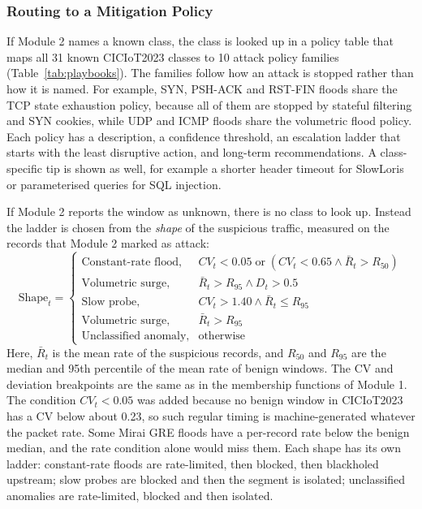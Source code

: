 \documentclass[]{interact}
\theoremstyle{plain}%
\theoremstyle{definition}
\theoremstyle{remark}
\begin{document}
\subsubsection{Routing to a Mitigation Policy}
If Module 2 names a known class, the class is looked up in a policy table that maps all 31 known CICIoT2023 classes to 10 attack policy families (Table~\ref{tab:playbooks}). The families follow how an attack is stopped rather than how it is named. For example, SYN, PSH-ACK and RST-FIN floods share the TCP state exhaustion policy, because all of them are stopped by stateful filtering and SYN cookies, while UDP and ICMP floods share the volumetric flood policy. Each policy has a description, a confidence threshold, an escalation ladder that starts with the least disruptive action, and long-term recommendations. A class-specific tip is shown as well, for example a shorter header timeout for SlowLoris or parameterised queries for SQL injection.

If Module 2 reports the window as unknown, there is no class to look up. Instead the ladder is chosen from the \emph{shape} of the suspicious traffic, measured on the records that Module 2 marked as attack:
\begin{equation}
  \text{Shape}_t =
  \begin{cases}
    \text{Constant-rate flood}, & CV_t < 0.05 \;\text{or}\; \left(CV_t < 0.65 \wedge \bar{R}_t > R_{50}\right)\\
    \text{Volumetric surge}, & \bar{R}_t > R_{95} \wedge D_t > 0.5\\
    \text{Slow probe}, & CV_t > 1.40 \wedge \bar{R}_t \le R_{95}\\
    \text{Volumetric surge}, & \bar{R}_t > R_{95}\\
    \text{Unclassified anomaly}, & \text{otherwise}
  \end{cases}
  \label{eq:shape}
\end{equation}
Here, $\bar{R}_t$ is the mean rate of the suspicious records, and $R_{50}$ and $R_{95}$ are the median and 95th percentile of the mean rate of benign windows. The CV and deviation breakpoints are the same as in the membership functions of Module 1. The condition $CV_t < 0.05$ was added because no benign window in CICIoT2023 has a CV below about 0.23, so such regular timing is machine-generated whatever the packet rate. Some Mirai GRE floods have a per-record rate below the benign median, and the rate condition alone would miss them. Each shape has its own ladder: constant-rate floods are rate-limited, then blocked, then blackholed upstream; slow probes are blocked and then the segment is isolated; unclassified anomalies are rate-limited, blocked and then isolated.
\end{document}
